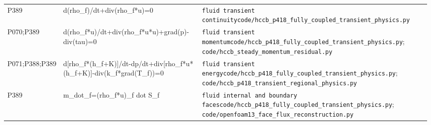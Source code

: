 \begin{longtable}{>{\raggedright\arraybackslash}p{2.0cm}>{\raggedright\arraybackslash}p{4.0cm}>{\raggedright\arraybackslash}p{12.2cm}}
P389 & d(\allowbreak{}rho\_\allowbreak{}f)/\allowbreak{}dt+div(\allowbreak{}rho\_\allowbreak{}f*u)=\allowbreak{}0 & \nolinkurl{fluid transient continuity}\newline \nolinkurl{code/hccb_p418_fully_coupled_transient_physics.py} \\
P070;\allowbreak{}P389 & d(\allowbreak{}rho\_\allowbreak{}f*u)/\allowbreak{}dt+div(\allowbreak{}rho\_\allowbreak{}f*u*u)+grad(\allowbreak{}p)-div(\allowbreak{}tau)=\allowbreak{}0 & \nolinkurl{fluid transient momentum}\newline \nolinkurl{code/hccb_p418_fully_coupled_transient_physics.py}; \nolinkurl{code/hccb_steady_momentum_residual.py} \\
P071;\allowbreak{}P388;\allowbreak{}P389 & d[rho\_\allowbreak{}f*(\allowbreak{}h\_\allowbreak{}f+K)]/\allowbreak{}dt-dp/\allowbreak{}dt+div[rho\_\allowbreak{}f*u*(\allowbreak{}h\_\allowbreak{}f+K)]-div(\allowbreak{}k\_\allowbreak{}f*grad(\allowbreak{}T\_\allowbreak{}f))=\allowbreak{}0 & \nolinkurl{fluid transient energy}\newline \nolinkurl{code/hccb_p418_fully_coupled_transient_physics.py}; \nolinkurl{code/hccb_p418_transient_regional_physics.py} \\
P389 & m\_\allowbreak{}dot\_\allowbreak{}f=\allowbreak{}(\allowbreak{}rho\_\allowbreak{}f*u)\_\allowbreak{}f dot S\_\allowbreak{}f & \nolinkurl{fluid internal and boundary faces}\newline \nolinkurl{code/hccb_p418_fully_coupled_transient_physics.py}; \nolinkurl{code/openfoam13_face_flux_reconstruction.py} \\
\end{longtable}
\endgroup
